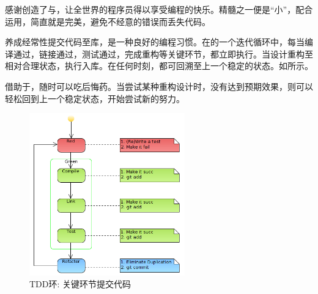 \begin{content}
\begin{story}
\begin{content}

感谢创造了与，让全世界的程序员得以享受编程的快乐。精髓之一便是“小”，配合运用，简直就是完美，避免不经意的错误而丢失代码。

养成经常性提交代码至库，是一种良好的编程习惯。在的一个迭代循环中，每当编译通过，链接通过，测试通过，完成重构等关键环节，都立即执行。当设计重构至相对合理状态，执行入库。在任何时刻，都可回溯至上一个稳定的状态。如所示。

借助于，随时可以吃后悔药。当尝试某种重构设计时，没有达到预期效果，则可以轻松回到上一个稳定状态，开始尝试新的努力。

\begin{figure}[H]
\centering
\includegraphics[width=0.6\textwidth]{figures/xunit/tdd-git.png}
\caption{TDD环: 关键环节提交代码}
 \label{fig:tdd-git}
\end{figure}

\end{content}

\end{story}

\end{content}


